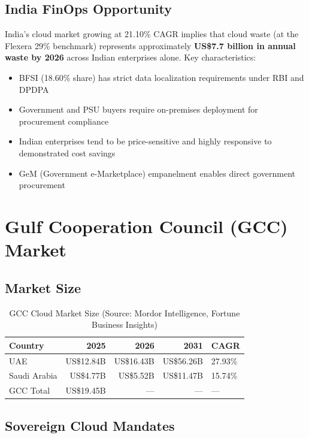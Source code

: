 \documentclass[a4paper,11pt]{article}
\begin{document}
\subsection{India FinOps Opportunity}

India's cloud market growing at 21.10\% CAGR implies that cloud waste (at the Flexera 29\% benchmark) represents approximately \textbf{US\$7.7 billion in annual waste by 2026} across Indian enterprises alone. Key characteristics:

\begin{itemize}[itemsep=1mm]
    \item BFSI (18.60\% share) has strict data localization requirements under RBI and DPDPA
    \item Government and PSU buyers require on-premises deployment for procurement compliance
    \item Indian enterprises tend to be price-sensitive and highly responsive to demonstrated cost savings
    \item GeM (Government e-Marketplace) empanelment enables direct government procurement
\end{itemize}

\section{Gulf Cooperation Council (GCC) Market}

\subsection{Market Size}

\begin{table}[H]
\centering
\begin{tabularx}{\textwidth}{Xrrrl}
\toprule
\textbf{Country} & \textbf{2025} & \textbf{2026} & \textbf{2031} & \textbf{CAGR} \\
\midrule
UAE & US\$12.84B & US\$16.43B & US\$56.26B & 27.93\% \\
Saudi Arabia & US\$4.77B & US\$5.52B & US\$11.47B & 15.74\% \\
GCC Total & US\$19.45B & --- & --- & --- \\
\bottomrule
\end{tabularx}
\caption{GCC Cloud Market Size (Source: Mordor Intelligence, Fortune Business Insights)}
\end{table}

\subsection{Sovereign Cloud Mandates}
\end{document}
